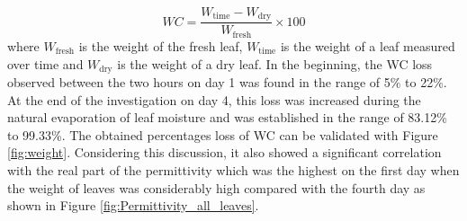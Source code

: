 \documentclass[preprints,article,accept,moreauthors,pdftex]{Definitions/mdpi}
\renewcommand{\^}{\hat}  %
\begin{document}
\begin{equation}
	WC = \frac{W_{\mathrm{time}} - W_{\mathrm{dry}}}{W_{\mathrm{fresh}}} \times 100%
	\label{eq:WC}
\end{equation}
where $W_{\mathrm{fresh}}$ is the weight of the fresh leaf, $W_{\mathrm{time}}$ is the weight of a leaf measured over time and $W_{\mathrm{dry}}$ is the weight of a dry leaf. In the beginning, the WC loss observed between the two hours on day 1 was found in the range of 5\% to 22\%. At the end of the investigation on day 4, this loss was increased during the natural evaporation of leaf moisture and was established in the range of 83.12\% to 99.33\%.
The obtained percentages loss of WC can be validated with Figure \ref{fig:weight}. Considering this discussion, it also showed a significant correlation with the real part of the permittivity which was the highest on the first day when the weight of leaves was considerably high compared with the fourth day as shown in Figure \ref{fig:Permittivity_all_leaves}.
\end{document}

